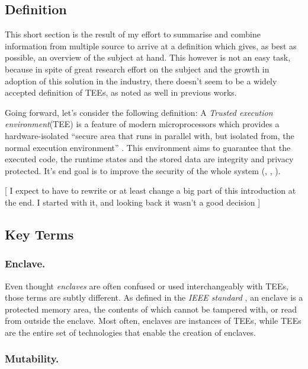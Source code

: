 \documentclass[runningheads,a4paper]{uwsese}
\begin{document}
\subsection{Definition}

This short section is the result of my effort to summarise and combine
information from multiple source to arrive at a definition which gives, as best
as possible, an overview of the subject at hand. This however is not an easy
task, because in spite of great research effort on the subject and the growth in
adoption of this solution in the industry, there doesn't seem to be a widely
accepted definition of TEEs, as noted as well in previous works.

Going forward, let's consider the following definition: A
\emph{Trusted execution environment}(TEE) is a feature of modern
microprocessors which provides a hardware-isolated ``secure area that runs in
parallel with, but isolated from, the normal execution environment''
\cite{tee_ieee_standard}. This environment aims to guarantee that the executed
code, the runtime states and the stored data are integrity and privacy
protected. It's end goal is to improve the security of the whole
system (\cite{tee_review_of_applications}, \cite{tee_in_securities},
\cite{tee_is_and_not}).

[ I expect to have to rewrite or at least change a big part of this introduction at the end. I started with it, and looking back it wasn't a good decision ]

\subsection{Key Terms}

\subsubsection{Enclave.}

Even thought \emph{enclaves} are often confused or used interchangeably with
TEEs, those terms are subtly different. As defined in the \emph{IEEE standard}
\cite{tee_ieee_standard}, an enclave is a protected memory area, the contents
of which cannot be tampered with, or read from outside the enclave. Most often,
enclaves are instances of TEEs, while TEEs are the entire set of technologies
that enable the creation of enclaves.

\subsubsection{Mutability.}
\end{document}
